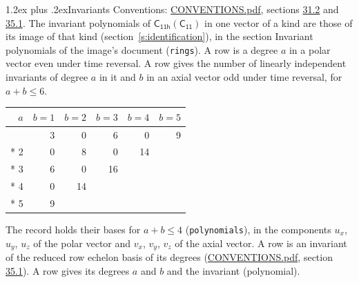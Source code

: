\documentclass[10pt,a4paper]{article}
\makeatletter
\renewcommand\section{\@startsection{section}{1}{\z@}{-3ex plus -1ex minus -.2ex}%
  {1.2ex plus .2ex}{\normalfont\large\sffamily\bfseries\color{parttitle}}}
\numberwithin{equation}{section}
\newcommand{\grp}[1]{\mathsf{#1}}
\makeatother
\begin{document}
\section{Invariants}\label{s:invariants}
Conventions: \href{../../CONVENTIONS.pdf}{CONVENTIONS.pdf}, sections \href{../../CONVENTIONS.pdf\#conv.31.2}{31.2} and \href{../../CONVENTIONS.pdf\#conv.35.1}{35.1}.
The invariant polynomials of $\grp{C_{11h}}(\grp{C_{11}})$ in one vector of a kind are those of its image of that kind (section~\ref{s:identification}), in the section Invariant polynomials of the image's document (\texttt{rings}).
\leavevmode\label{n:index.degree.polar}\label{n:index.degree.axial}A row is a degree $a$ in a polar vector even under time reversal. A row gives the number of linearly independent invariants of degree $a$ in it and $b$ in an axial vector odd under time reversal, for $a + b \le 6$.
{\small\begin{longtable}{@{}rrrrrr@{}}\toprule
$a$ & $b = 1$ & $b = 2$ & $b = 3$ & $b = 4$ & $b = 5$\\\midrule\endhead
\bottomrule\endfoot\endlastfoot
1 & 3 & 0 & 6 & 0 & 9\\*
2 & 0 & 8 & 0 & 14 & \\*
3 & 6 & 0 & 16 &  & \\*
4 & 0 & 14 &  &  & \\*
5 & 9 &  &  &  & \\
\bottomrule\end{longtable}}
\leavevmode\label{n:local.component.polar}\label{n:local.component.axial}The record holds their bases for $a + b \le 4$ (\texttt{polynomials}), in the components $u_{x}$, $u_{y}$, $u_{z}$ of the polar vector and $v_{x}$, $v_{y}$, $v_{z}$ of the axial vector. \label{n:head.polynomial}A row is an invariant of the reduced row echelon basis of its degrees (\href{../../CONVENTIONS.pdf}{CONVENTIONS.pdf}, section \href{../../CONVENTIONS.pdf\#conv.35.1}{35.1}). A row gives its degrees $a$ and $b$ and the invariant (polynomial).
\end{document}
